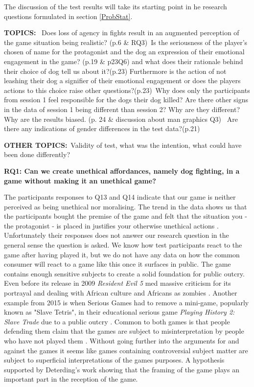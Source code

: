 The discussion of the test results will take its starting point in he research questions formulated in section \ref{ProbStat}. 


\textbf{TOPICS:} \
Does loss of agency in fights result in an augmented perception of the game situation being realistic? (p.6 \& RQ3)\
Is the seriousness of the player's chosen of name for the protagonist and the dog an expression of their emotional engagement in the game? (p.19 \& p23Q6) and what does their rationale behind their choice of dog tell us about it?(p.23) Furthermore is the action of not leashing their dog a signifier of their emotional engagement or does the players actions to this choice raise other questions?(p.23)\
Why does only the participants from session 1 feel responsible for the dogs their dog killed? Are there other signs in the data of session 1 being different than session 2? Why are they different? Why are the results biased. (p. 24 \& discussion about man graphics Q3) \
Are there any indications of gender differences in the test data?(p.21)


\textbf{OTHER TOPICS:}\
Validity of test, what was the intention, what could have been done differently?





\textbf{RQ1: Can we create unethical affordances, namely dog fighting, in a game without making it an unethical game?}\

The participants responses to Q13 and Q14 indicate that our game is neither perceived as being unethical nor moralising. The trend in the data shows us that the participants bought the premise of the game and felt that the situation you - the protagonist - is placed in justifies your otherwise unethical actions . Unfortunately their responses does not answer our research question in the general sense the question is asked. We know how test participants react to the game after having played it, but we do not have any data on how the common consumer will react to a game like this once it surfaces in public. The game contains enough sensitive subjects to create a solid foundation for public outcry. Even before its release in 2009 \textit{Resident Evil 5} \citep[RE5]{game:re} med massive criticism for its portrayal and dealing with African culture and Africans as zombies \citep{harrer2015black}. Another example from 2015 is when Serious Games had to remove a mini-game, popularly known as "Slave Tetris", in their educational serious game \textit{Playing History 2: Slave Trade}  due to a public outcry \citep{kotaku}. Common to both games is that people defending them claim that the games are subject to misinterpretation by people who have not played them \citep{harrer2015black, kotaku, mtv}. Without going further into the arguments for and against the games it seems like games containing controversial subject matter are subject to superficial interpretations of the games purposes. A hypothesis supported by Deterding's \citeyear{deterding2016mechanic} work showing that the framing of the game plays an important part in the reception of the game.

